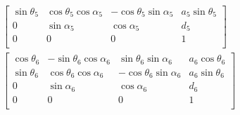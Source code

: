 \begin{multline}
\begin{bmatrix}
\sin\theta_5 & \cos\theta_5  \cos\alpha_5 & -\cos\theta_5  \sin\alpha_5 & a_5  \sin\theta_5 \\
0 & \sin\alpha_5 & \cos\alpha_5 & d_5 \\
0 & 0 & 0 & 1 \\
\end{bmatrix}
  \\
\begin{bmatrix}
\cos\theta_6 & -\sin\theta_6  \cos\alpha_6 & \sin\theta_6  \sin\alpha_6 & a_6  \cos\theta_6 \\
\sin\theta_6 & \cos\theta_6  \cos\alpha_6 & -\cos\theta_6  \sin\alpha_6 & a_6  \sin\theta_6 \\
0 & \sin\alpha_6 & \cos\alpha_6 & d_6 \\
0 & 0 & 0 & 1 \\
\end{bmatrix}
\phantom{  }\\
\end{multline}
